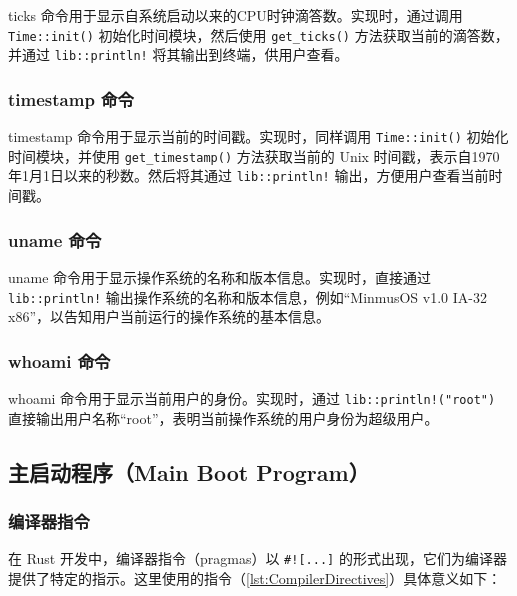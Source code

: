 ticks 命令用于显示自系统启动以来的CPU时钟滴答数。实现时，通过调用 \texttt{Time::init()} 初始化时间模块，然后使用 \texttt{get\_ticks()} 方法获取当前的滴答数，并通过 \texttt{lib::println!} 将其输出到终端，供用户查看。

\subsubsection{timestamp 命令}

timestamp 命令用于显示当前的时间戳。实现时，同样调用 \texttt{Time::init()} 初始化时间模块，并使用 \texttt{get\_timestamp()} 方法获取当前的 Unix 时间戳，表示自1970年1月1日以来的秒数。然后将其通过 \texttt{lib::println!} 输出，方便用户查看当前时间戳。

\subsubsection{uname 命令}

uname 命令用于显示操作系统的名称和版本信息。实现时，直接通过 \texttt{lib::println!} 输出操作系统的名称和版本信息，例如“MinmusOS v1.0 IA-32 x86”，以告知用户当前运行的操作系统的基本信息。

\subsubsection{whoami 命令}

whoami 命令用于显示当前用户的身份。实现时，通过 \texttt{lib::println!("root")} 直接输出用户名称“root”，表明当前操作系统的用户身份为超级用户。

\subsection{主启动程序（Main Boot Program）}

\subsubsection{编译器指令}

在 Rust 开发中，编译器指令（pragmas）以 \texttt{\#![...]} 的形式出现，它们为编译器提供了特定的指示。这里使用的指令（\cref{lst:CompilerDirectives}）具体意义如下：

